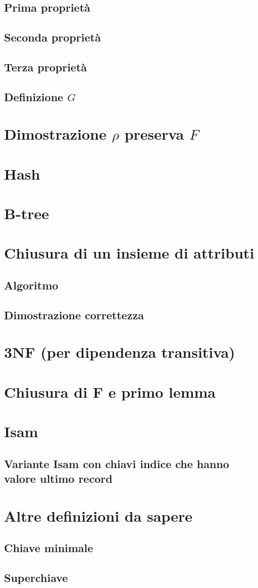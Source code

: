 \documentclass{article}
\begin{document}
\subsection{Prima proprietà}
\subsection{Seconda proprietà}
\subsection{Terza proprietà}
\subsection{Definizione $G$}
\pagebreak
\section{Dimostrazione $\rho$ preserva $F$}
\pagebreak
\section{Hash}
\pagebreak
\section{B-tree}
\pagebreak
\section{Chiusura di un insieme di attributi}
\subsection{Algoritmo}
\subsection{Dimostrazione correttezza}
\pagebreak
\section{3NF (per dipendenza transitiva)}
\pagebreak
\section{Chiusura di F e primo lemma}
\pagebreak
\section{Isam}
\subsection{Variante Isam con chiavi indice che hanno valore ultimo record}
\pagebreak
\section{Altre definizioni da sapere}
\subsection{Chiave minimale} 
\subsection{Superchiave}
\end{document}
